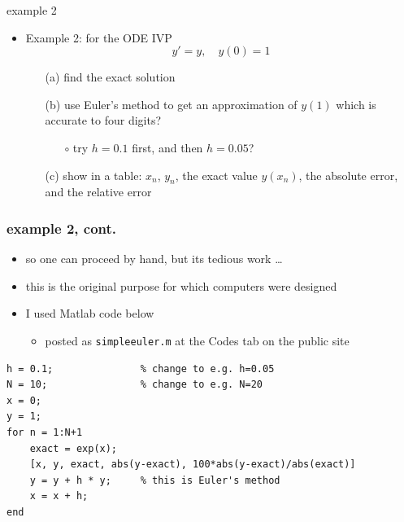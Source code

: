\documentclass{beamer}
\begin{document}
\begin{frame}{example 2}

\begin{itemize}
\item Example 2:  for the ODE IVP
    $$y'=y, \quad y(0)=1$$

    \begin{itemize}
    \item[(a)] find the exact solution
    \item[(b)] use Euler's method to get an approximation of $y(1)$ which is accurate to four digits?
        \begin{itemize}
        \item[$\circ$] try $h=0.1$ first, and then $h=0.05$?
        \end{itemize}
    \item[(c)] show in a table: $x_n$, $y_n$, the exact value $y(x_n)$, the absolute error, and the relative error
    \end{itemize}
\end{itemize}

\vspace{40mm}
\end{frame}


\begin{frame}[fragile]
\frametitle{example 2, cont.}

\begin{itemize}
\item so one can proceed by hand, but its tedious work \dots
\item \alert{this is the original purpose for which computers were designed}
\item I used Matlab code below
    \begin{itemize}
    \item posted as \texttt{simpleeuler.m} at the Codes tab on the public site
    \end{itemize}
\end{itemize}

\medskip
{\footnotesize
\begin{Verbatim}
h = 0.1;               % change to e.g. h=0.05
N = 10;                % change to e.g. N=20
x = 0;
y = 1;
for n = 1:N+1
    exact = exp(x);
    [x, y, exact, abs(y-exact), 100*abs(y-exact)/abs(exact)]
    y = y + h * y;     % this is Euler's method
    x = x + h;
end
\end{Verbatim}
}
\end{frame}
\end{document}

